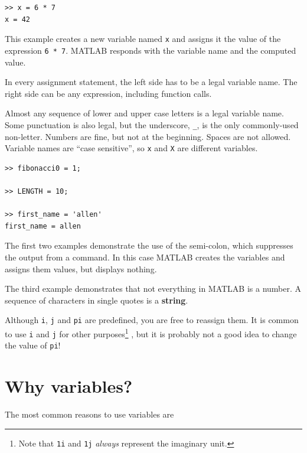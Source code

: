 \documentclass{book}
\begin{document}
\begin{verbatim}
>> x = 6 * 7
x = 42
\end{verbatim}

This example creates a new variable named {\tt x} and assigns it the
value of the expression {\tt 6 * 7}.  MATLAB responds with the
variable name and the computed value.

In every assignment statement, the left side has to be a
legal variable name.  The right side can be any expression,
including function calls.

Almost any sequence of lower and upper case letters is a legal
variable name.  Some punctuation is also legal, but the underscore,
{\tt \_}, is the only commonly-used non-letter.  Numbers are fine, but
not at the beginning.  Spaces are not allowed.  Variable names are
``case sensitive'', so {\tt x} and {\tt X} are different variables.

\begin{verbatim}
>> fibonacci0 = 1;

>> LENGTH = 10;

>> first_name = 'allen'
first_name = allen
\end{verbatim}

The first two examples demonstrate the use of the semi-colon, which
suppresses the output from a command.  In this case MATLAB creates the
variables and assigns them values, but displays nothing.

The third example demonstrates that not everything
in MATLAB is a number.  A sequence of characters in single quotes is
a {\bf string}.

Although {\tt i}, {\tt j} and {\tt pi} are predefined, you are free
to reassign them.  It is common to use {\tt i} and {\tt j} for other
purposes\footnote{Note that {\tt 1i} and {\tt 1j} \textit{always}
represent the imaginary unit.}
, but it is probably not a good idea to change the value of
{\tt pi}!

\section{Why variables?}

The most common reasons to use variables are
\end{document}
